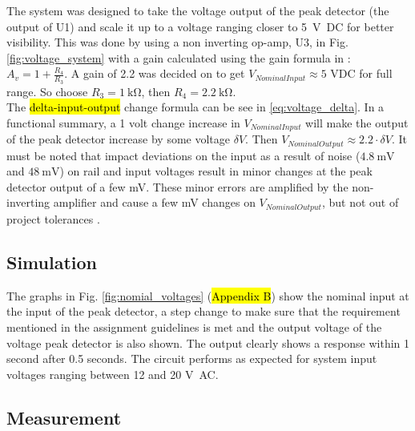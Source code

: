 The system was designed to take the voltage output of the peak detector (the output of U1) and scale it up to a voltage ranging closer to \SI{5}{\volt DC} for better visibility. This was done by using a non inverting op-amp, U3, in Fig. \ref{fig:voltage_system} with a gain calculated using the gain formula in \cite{non-inverting}: $A_v=1+\frac{R_4}{R_3} $.
A gain of 2.2 was decided on to get $V_{Nominal Input}\approx5$ VDC for full range. So choose $R_3=\SI{1}{\kilo\ohm}$, then $R_4=\SI{2.2}{\kilo\ohm}$.\\
The \hl{delta-input-output} change formula can be see in \ref{eq:voltage_delta}. In a functional summary, a 1 volt change increase in $V_{Nominal Input}$ will make the output of the peak detector increase by some voltage $\delta V$. Then $V_{Nominal Output} \approx2.2\cdot\delta V$.
It must be noted that impact deviations on the input as a result of noise ($\SI{4.8}{\milli \volt}$ and $\SI{48}{\milli \volt}$) on rail and input voltages result in minor changes at the peak detector output of a few mV. These minor errors are amplified by the non-inverting amplifier \cite{non-inverting} and cause a few mV changes on $V_{Nominal Output}$, but not out of project tolerances \cite{assignment_2}.



\subsection{Simulation} \label{sec:vtrans_simu}

The graphs in Fig. \ref{fig:nomial_voltages} (\hl{Appendix B}) show the nominal input at the input of the peak detector, a step change to make sure that the requirement mentioned in the assignment guidelines \cite{assignment_2} is met and the output voltage of the voltage peak detector is also shown. The output clearly shows a response within 1 second after 0.5 seconds. The circuit performs as expected for system input voltages ranging between 12 and 20 \si{\volt AC}.


\subsection{Measurement} \label{sec:vtrans_meas}


